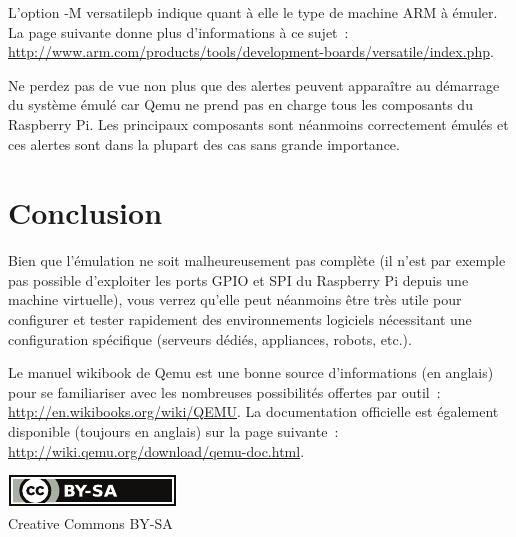 \documentclass{article}
\begin{document}
L'option \og{}-M versatilepb\fg{} indique quant à elle le type de machine ARM à
émuler. La page suivante donne plus d'informations à ce sujet~:
\href{https://web.archive.org/web/20150327192315/http://arm.com/products/tools/development-boards/versatile/index.php}{http://www.arm.com/products/tools/development-boards/versatile/index.php}.

Ne perdez pas de vue non plus que des alertes peuvent apparaître au démarrage
du système émulé car Qemu ne prend pas en charge tous les composants du
Raspberry Pi. Les principaux composants sont néanmoins correctement émulés et
ces alertes sont dans la plupart des cas sans grande importance.



\section*{Conclusion}\label{sec:ccl}

Bien que l'émulation ne soit malheureusement pas complète (il n'est par exemple
pas possible d'exploiter les ports GPIO et SPI du Raspberry Pi depuis une
machine virtuelle), vous verrez qu'elle peut néanmoins être très utile pour
configurer et tester rapidement des environnements logiciels nécessitant une
configuration spécifique (serveurs dédiés, appliances, robots, etc.).
 
Le manuel wikibook de Qemu est une bonne source d'informations (en anglais)
pour se familiariser avec les nombreuses possibilités offertes par outil~:
\url{http://en.wikibooks.org/wiki/QEMU}.
La documentation officielle est également disponible (toujours en anglais) sur la
page suivante~: \url{http://wiki.qemu.org/download/qemu-doc.html}.



\nocite{*}                    %




\ifpdf
    \vfill %
    \begin{center}
        \href{http://creativecommons.org/licenses/by-sa/4.0/}{\includegraphics[width=.15\linewidth]{fig/cc_by_sa_small}}\\
        \small{Creative Commons BY-SA}
    \end{center}
\else
\end{document}

